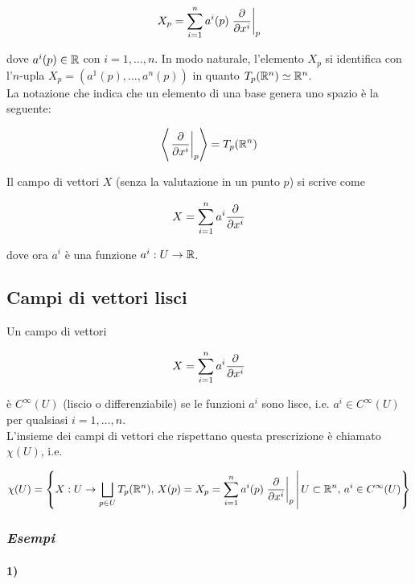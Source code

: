 \begin{equation}
	X_{p} = \sum_{i=1}^{n} a^{i}(p) \eval{ \pdv{x^{i}} }_{p}
\end{equation}

dove $ a^{i}(p) \in \mathbb{R} $ con $ i=1,\dots,n $. In modo naturale, l'elemento $ X_{p} $ si identifica con l'$ n $-upla $ X_{p} = (a^{1}(p),\dots,a^{n}(p)) $ in quanto $ T_{p}(\mathbb{R}^{n}) \simeq \mathbb{R}^{n} $. \\
La notazione che indica che un elemento di una base genera uno spazio è la seguente:

\begin{equation}
	\ev{ \eval{ \pdv{x^{i}} }_{p} } = T_{p}(\R^{n})
\end{equation}

Il campo di vettori $ X $ (senza la valutazione in un punto $ p $) si scrive come

\begin{equation}
	X = \sum_{i=1}^{n} a^{i} \pdv{x^{i}}
\end{equation}

dove ora $ a^{i} $ è una funzione $ a^{i} : U \to \mathbb{R} $.

\subsection{Campi di vettori lisci}

Un campo di vettori

\begin{equation}
	X = \sum_{i=1}^{n} a^{i} \pdv{x^{i}}
\end{equation}

è $ C^{\infty} (U) $ (liscio o differenziabile) se le funzioni $ a^{i} $ sono lisce, i.e. $ a^{i} \in C^{\infty}(U) $ per qualsiasi $ i=1,\dots,n $. \\
L'insieme dei campi di vettori che rispettano questa prescrizione è chiamato $ \chi(U) $, i.e.

\begin{equation}
	\chi(U) = \left\{ X : U \to \bigsqcup_{p \in U} T_{p}(\R^{n}), \, X(p) = X_{p} = \sum_{i=1}^{n} a^{i}(p) \eval{ \pdv{x^{i}} }_{p} \st U \subset \R^{n}, \, a^{i} \in C^{\infty}(U) \right\}
\end{equation}

\subsubsection{\textit{Esempi}}

\paragraph{1)}

